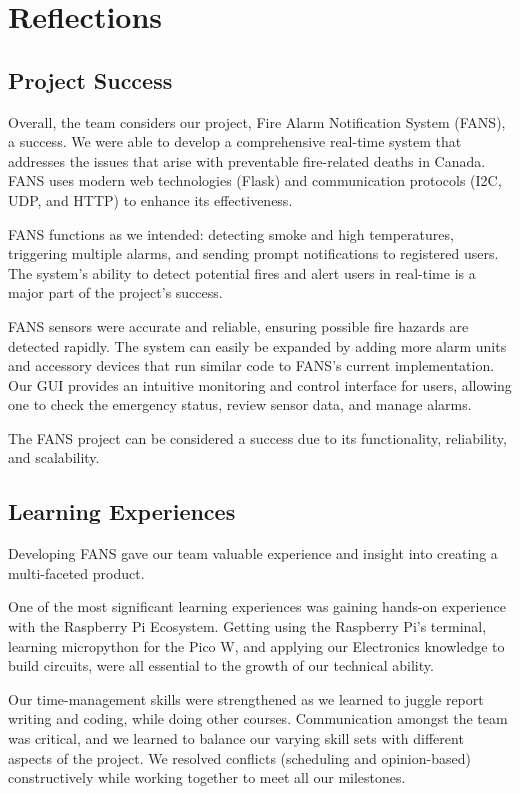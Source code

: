 \section{Reflections}

\subsection{Project Success}

Overall, the team considers our project, Fire Alarm Notification System (FANS), a success. We were able to develop a
comprehensive real-time system that addresses the issues that arise with preventable fire-related deaths in Canada.
FANS uses modern web technologies (Flask) and communication protocols (I2C, UDP, and HTTP) to enhance its
effectiveness.

FANS functions as we intended: detecting smoke and high temperatures, triggering multiple alarms, and sending prompt
notifications to registered users. The system's ability to detect potential fires and alert users in real-time is a
major part of the project’s success.

FANS sensors were accurate and reliable, ensuring possible fire hazards are detected rapidly. The system can easily be
expanded by adding more alarm units and accessory devices that run similar code to FANS’s current implementation. Our
GUI provides an intuitive monitoring and control interface for users, allowing one to check the emergency status,
review sensor data, and manage alarms.

The FANS project can be considered a success due to its functionality, reliability, and scalability.

\subsection{Learning Experiences}

Developing FANS gave our team valuable experience and insight into creating a multi-faceted product.

One of the most significant learning experiences was gaining hands-on experience with the Raspberry Pi Ecosystem. Getting 
using the Raspberry Pi's terminal, learning micropython for the Pico W, and applying our Electronics knowledge to build 
circuits, were all essential to the growth of our technical ability.

Our time-management skills were strengthened as we learned to juggle report writing and coding, while doing other 
courses. Communication amongst the team was critical, and we learned to balance our varying skill sets with different 
aspects of the project. We resolved conflicts (scheduling and opinion-based) constructively while working together to 
meet all our milestones.

